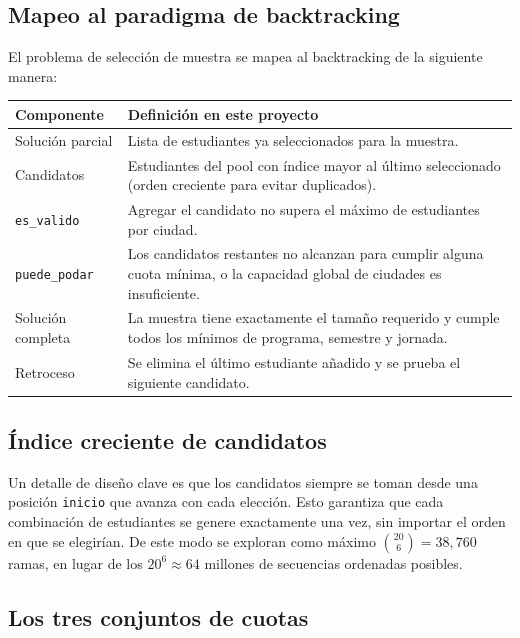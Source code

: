 \documentclass[12pt, a4paper]{article}
\begin{document}
\subsection{Mapeo al paradigma de backtracking}

El problema de selección de muestra se mapea al backtracking de la siguiente manera:

\begin{center}
\begin{tabular}{p{3.5cm}p{9cm}}
  \toprule
  \textbf{Componente} & \textbf{Definición en este proyecto} \\
  \midrule
  Solución parcial    & Lista de estudiantes ya seleccionados para la muestra. \\
  Candidatos          & Estudiantes del pool con índice mayor al último seleccionado (orden creciente para evitar duplicados). \\
  \texttt{es\_valido}        & Agregar el candidato no supera el máximo de estudiantes por ciudad. \\
  \texttt{puede\_podar}      & Los candidatos restantes no alcanzan para cumplir alguna cuota mínima, o la capacidad global de ciudades es insuficiente. \\
  Solución completa   & La muestra tiene exactamente el tamaño requerido y cumple todos los mínimos de programa, semestre y jornada. \\
  Retroceso           & Se elimina el último estudiante añadido y se prueba el siguiente candidato. \\
  \bottomrule
\end{tabular}
\end{center}

\subsection{Índice creciente de candidatos}

Un detalle de diseño clave es que los candidatos siempre se toman desde una posición \texttt{inicio} que avanza con cada elección. Esto garantiza que cada combinación de estudiantes se genere exactamente una vez, sin importar el orden en que se elegirían. De este modo se exploran como máximo $\binom{20}{6} = 38{,}760$ ramas, en lugar de los $20^6 \approx 64$ millones de secuencias ordenadas posibles.

\subsection{Los tres conjuntos de cuotas}
\end{document}
